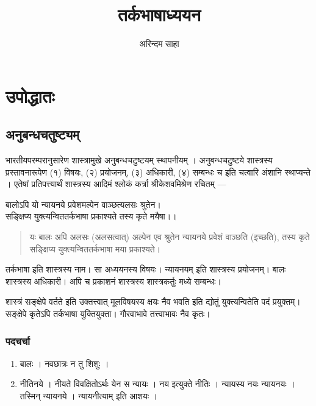 \documentclass[12pt,a4paper]{report}
\author{अरिन्दम साहा}
\title{तर्कभाषाध्ययन}
\begin{document}
\maketitle

\chapter{उपोद्धातः}

\section{अनुबन्धचतुष्ट्यम्}

भारतीयपरम्परानुसारेण शास्त्रामुखे अनुबन्धचटुष्टयम् स्थापनीयम् । अनुबन्धचटुष्टये शास्त्रस्य प्रस्तावनारूपेण (१) विषयः, (२) प्रयोजनम्, (३) अधिकारी, (४) सम्बन्धः च इति चत्वारि अंशानि स्थाप्यन्ते । एतेषां प्रतिपत्त्यार्थं शास्त्रस्य आदिमं श्लोकं कर्त्रा श्रीकेशवमिश्रेण रचितम् ---

\begin{large}
\begin{center}
बालोऽपि यो न्यायनये प्रवेशमल्पेन वाञ्छत्यलसः श्रुतेन।\\
सङ्क्षिप्य युक्त्यन्विततर्कभाषा प्रकाश्यते तस्य कृते मयैषा।।
\end{center}

\begin{quote}
यः बालः अपि अलसः (अलसत्वात्) अल्पेन एव श्रुतेन न्यायनये प्रवेशं वाञ्छति (इच्छति), तस्य कृते सङ्क्षिप्य युक्त्यन्विततर्कभाषा मया प्रकाश्यते।
\end{quote}
\end{large}

तर्कभाषा इति शास्त्रस्य नाम। सा अध्ययनस्य विषयः। न्यायनयम् इति शास्त्रस्य प्रयोजनम्। बालः शास्त्रस्य अधिकारी। अपि च प्रकाशनं शास्त्रस्य शास्त्रकर्तुः मध्ये सम्बन्धः।

शास्त्रं सङ्क्षेपे वर्तते इति उक्तत्त्वात् मूलविषयस्य क्षयः नैव भवति इति द्योतुं युक्त्यन्वितेति पदं प्रयुक्तम्। सङ्क्षेपे कृतेऽपि तर्कभाषा युक्तियुक्ता। गौरवाभावे तत्त्वाभावः नैव कृतः।

\subsection*{पदचर्चा}

\begin{enumerate}
 \item बालः । नवछात्रः न तु शिशुः ।
  \item नीतिनये । नीयते विवक्षितोऽर्थः येन स न्यायः । नय इत्युक्ते नीतिः । न्यायस्य नयः न्यायनयः । तस्मिन् न्यायनये । न्यायनीत्याम् इति आशयः ।
\end{enumerate}
\end{document}
